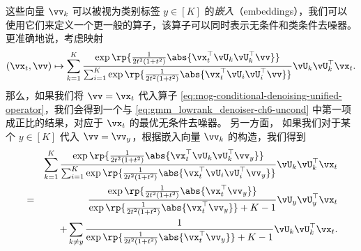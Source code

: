 \documentclass[../../book-main_zh.tex]{subfiles}
\begin{document}
\begin{example}
    这些向量 $\vv_k$ 可以被视为类别标签 $y \in [K]$ 的\textit{嵌入}（embeddings），我们可以使用它们来定义一个更一般的算子，该算子可以同时表示无条件和类条件去噪器。
    更准确地说，考虑映射
    \begin{equation}\label{eq:mog-conditional-denoising-unified-operator}
        (\vx_t, \vv) \mapsto
        \sum_{k = 1}^{K}\frac{
            \exp\rp{\frac{1}{2t^{2}(1
            + t^{2})} \abs{\vx_t^\top \vU_k \vU_k^\top \vv}}
        }
        {
            \sum_{i
            = 1}^{K}\exp\rp{\frac{1}{2t^{2}(1
            + t^{2})}\abs{\vx_t^\top \vU_i \vU_i^\top \vv}}
        }
        \vU_{k}\vU_{k}^{\top}\vx_t.
    \end{equation}
    那么，如果我们将 $\vv = \vx_t$ 代入算子
    \eqref{eq:mog-conditional-denoising-unified-operator}，我们会得到一个与
    \eqref{eq:gmm_lowrank_denoiser-ch6-uncond} 中第一项成正比的结果，对应于 $\vx_t$ 的最优无条件去噪器。
    另一方面，
    如果我们对于某个 $y \in [K]$ 代入 $\vv = \vv_y$，根据嵌入向量 $\vv_k$ 的构造，我们得到
    \begin{eqnarray}
        &&\sum_{k = 1}^{K}
        \frac{
            \exp\rp{\frac{1}{2t^{2}(1
            + t^{2})}\abs{\vx_t^\top \vU_k \vU_k^\top \vv_y}}
        }
        {
            \sum_{i
            = 1}^{K}\exp\rp{\frac{1}{2t^{2}(1
            + t^{2})}\abs{\vx_t^\top \vU_i \vU_i^\top \vv_y}}
        }
        \vU_{k}\vU_{k}^{\top}\vx_t \nonumber \\
        &=&
        \frac{
            \exp\rp{\frac{1}{2t^{2}(1
            + t^{2})}\abs{\vx_t^\top \vv_y}}
        }
        {
            \exp\rp{\frac{1}{2t^{2}(1
            + t^{2})}\abs{\vx_t^\top \vv_y}}
            + K-1
        }
        \vU_{y}\vU_{y}^{\top}\vx_t
        \\
        && +
        \sum_{k \neq y}
        \frac{
            1
        }
        {
            \exp\rp{\frac{1}{2t^{2}(1
            + t^{2})}\abs{\vx_t^\top \vv_y}}
            + K-1
        }
        \vU_{k}\vU_{k}^{\top}\vx_t.
    \end{eqnarray}


\end{example}
\end{document}

